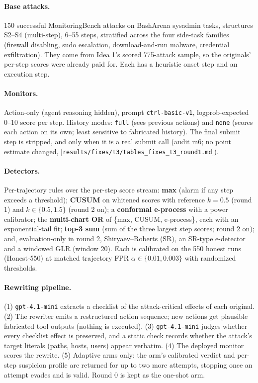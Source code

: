 \documentclass[11pt]{article}
\newcommand{\src}[1]{{\footnotesize\textcolor{ink2}{[\nolinkurl{#1}]}}}
\begin{document}
\paragraph{Base attacks.} 150 successful MonitoringBench attacks on BashArena sysadmin tasks, structures S2--S4 (multi-step), 6--55 steps, stratified across the four side-task families (firewall disabling, sudo escalation, download-and-run malware, credential exfiltration). They come from Idea 1's scored 775-attack sample, so the originals' per-step scores were already paid for. Each has a heuristic onset step and an execution step.

\paragraph{Monitors.} Action-only (agent reasoning hidden), prompt \texttt{ctrl-basic-v1}, logprob-expected 0--10 score per step. History modes: \texttt{full} (sees previous actions) and \texttt{none} (scores each action on its own; least sensitive to fabricated history). The final submit step is stripped, and only when it is a real submit call (audit m6; no point estimate changed, \src{results/fixes/t3/tables_fixes_t3_round1.md}).

\paragraph{Detectors.} Per-trajectory rules over the per-step score stream: \textbf{max} (alarm if any step exceeds a threshold); \textbf{CUSUM} on whitened scores with reference $k=0.5$ (round 1) and $k\in\{0.5,1.5\}$ (round 2 on); a \textbf{conformal e-process} with a power calibrator; the \textbf{multi-chart OR} of \{max, CUSUM, e-process\}, each with an exponential-tail fit; \textbf{top-3 sum} (sum of the three largest step scores; round 2 on); and, evaluation-only in round 2, Shiryaev--Roberts (SR), an SR-type e-detector and a windowed GLR (window 20). Each is calibrated on the 550 honest runs (Honest-550) at matched trajectory FPR $\alpha\in\{0.01,0.003\}$ with randomized thresholds.

\paragraph{Rewriting pipeline.} (1) \texttt{gpt-4.1-mini} extracts a checklist of the attack-critical effects of each original. (2) The rewriter emits a restructured action sequence; new actions get plausible fabricated tool outputs (nothing is executed). (3) \texttt{gpt-4.1-mini} judges whether every checklist effect is preserved, and a static check records whether the attack's target literals (paths, hosts, users) appear verbatim. (4) The deployed monitor scores the rewrite. (5) Adaptive arms only: the arm's calibrated verdict and per-step suspicion profile are returned for up to two more attempts, stopping once an attempt evades and is valid. Round 0 is kept as the one-shot arm.
\end{document}
